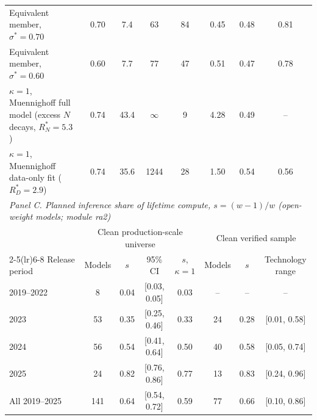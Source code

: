 \begin{table}[htbp]
\begin{tabular}{lccccccc}
Equivalent member, $\sigma^*=0.70$ & 0.70 & 7.4 & 63 & 84 & 0.45 & 0.48 & 0.81 \\
Equivalent member, $\sigma^*=0.60$ & 0.60 & 7.7 & 77 & 47 & 0.51 & 0.47 & 0.78 \\
$\kappa=1$, Muennighoff full model (excess $N$ decays, $R^*_N=5.3$) & 0.74 & 43.4 & $\infty$ & 9 & 4.28 & 0.49 & -- \\
$\kappa=1$, Muennighoff data-only fit ($R^*_D=2.9$) & 0.74 & 35.6 & 1244 & 28 & 1.50 & 0.54 & 0.56 \\
\midrule
\multicolumn{8}{l}{\textit{Panel C. Planned inference share of lifetime compute, $s=(w-1)/w$ (open-weight models; module ra2)}} \\
 & \multicolumn{4}{c}{Clean production-scale universe} & \multicolumn{3}{c}{Clean verified sample} \\
\cmidrule(lr){2-5}\cmidrule(lr){6-8}
Release period & Models & $s$ & 95\% CI & $s$, $\kappa=1$ & Models & $s$ & Technology range \\
\midrule
2019--2022 & 8 & 0.04 & [0.03, 0.05] & 0.03 & -- & -- & -- \\
2023 & 53 & 0.35 & [0.25, 0.46] & 0.33 & 24 & 0.28 & [0.01, 0.58] \\
2024 & 56 & 0.54 & [0.41, 0.64] & 0.50 & 40 & 0.58 & [0.05, 0.74] \\
2025 & 24 & 0.82 & [0.76, 0.86] & 0.77 & 13 & 0.83 & [0.24, 0.96] \\
All 2019--2025 & 141 & 0.64 & [0.54, 0.72] & 0.59 & 77 & 0.66 & [0.10, 0.86] \\
\bottomrule
\end{tabular}
\begin{tablenotes}\footnotesize

\end{tablenotes}
\end{table}
